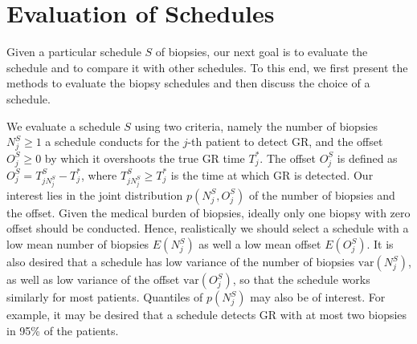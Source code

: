 
\section{Evaluation of Schedules}
\label{sec : choosing_schedule}
Given a particular schedule $S$ of biopsies, our next goal is to evaluate the schedule and to compare it with other schedules. To this end, we first present the methods to evaluate the biopsy schedules and then discuss the choice of a schedule.

We evaluate a schedule $S$ using two criteria, namely the number of biopsies $N^S_j \geq 1$ a schedule conducts for the $j$-th patient to detect GR, and the offset $O^S_j \geq 0$ by which it overshoots the true GR time $T^*_j$. The offset $O^S_j$ is defined as $O^S_j = T^S_{j{N^S_j}} - T^*_j$, where $T^S_{j{N^S_j}} \geq T^*_j$ is the time at which GR is detected. Our interest lies in the joint distribution $p(N^S_j, O^S_j)$ of the number of biopsies and the offset. Given the medical burden of biopsies, ideally only one biopsy with zero offset should be conducted. Hence, realistically we should select a schedule with a low mean number of biopsies $E(N^S_j)$ as well a low mean offset $E(O^S_j)$. It is also desired that a schedule has low variance of the number of biopsies $\mbox{var}(N^S_j)$, as well as low variance of the offset $\mbox{var}(O^S_j)$, so that the schedule works similarly for most patients. Quantiles of $p(N^S_j)$ may also be of interest. For example, it may be desired that a schedule detects GR with at most two biopsies in 95\% of the patients.

